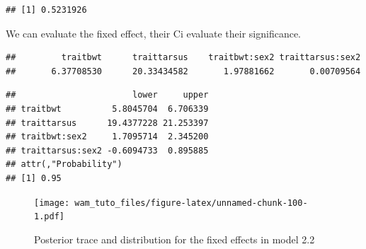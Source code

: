 \documentclass[
  12pt,
]{book}
\newenvironment{Shaded}{\begin{snugshade}}{\end{snugshade}}
\newcommand{\DecValTok}[1]{\textcolor[rgb]{0.00,0.00,0.81}{#1}}
\newcommand{\FloatTok}[1]{\textcolor[rgb]{0.00,0.00,0.81}{#1}}
\newcommand{\FunctionTok}[1]{\textcolor[rgb]{0.00,0.00,0.00}{#1}}
\newcommand{\NormalTok}[1]{#1}
\newcommand{\SpecialCharTok}[1]{\textcolor[rgb]{0.00,0.00,0.00}{#1}}
\newcommand{\StringTok}[1]{\textcolor[rgb]{0.31,0.60,0.02}{#1}}
\begin{document}
\begin{Shaded}
\end{Shaded}

\begin{verbatim}
## [1] 0.5231926
\end{verbatim}

We can evaluate the fixed effect, their Ci evaluate their significance.

\begin{Shaded}
\end{Shaded}

\begin{verbatim}
##         traitbwt      traittarsus    traitbwt:sex2 traittarsus:sex2 
##       6.37708530      20.33434582       1.97881662       0.00709564
\end{verbatim}

\begin{Shaded}
\end{Shaded}

\begin{verbatim}
##                       lower     upper
## traitbwt          5.8045704  6.706339
## traittarsus      19.4377228 21.253397
## traitbwt:sex2     1.7095714  2.345200
## traittarsus:sex2 -0.6094733  0.895885
## attr(,"Probability")
## [1] 0.95
\end{verbatim}

\begin{Shaded}
\end{Shaded}

\begin{figure}
\centering
\texttt{[image: wam\_tuto\_files/figure-latex/unnamed-chunk-100-1.pdf]}
\caption{\label{fig:unnamed-chunk-100}Posterior trace and distribution for the fixed effects in model 2.2}
\end{figure}
\end{document}
